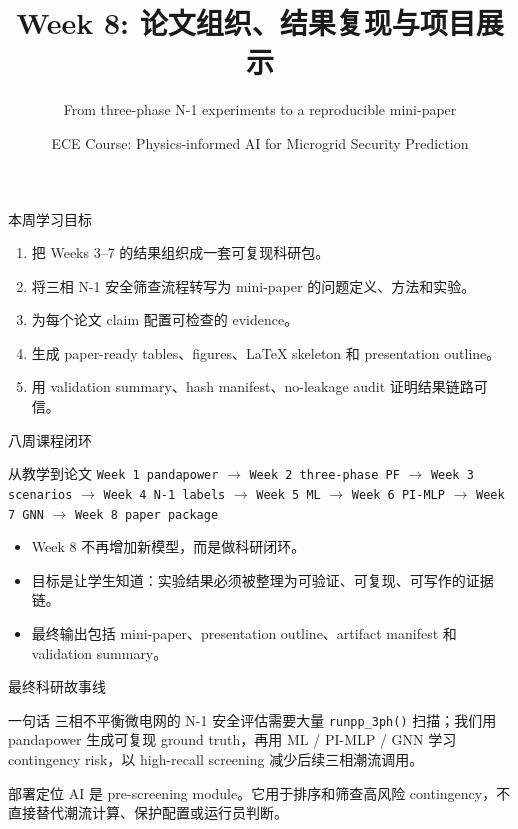 \documentclass[aspectratio=169,11pt]{beamer}
\title[Week 8]{Week 8: 论文组织、结果复现与项目展示}
\subtitle{From three-phase N-1 experiments to a reproducible mini-paper}
\author{ECE Course: Physics-informed AI for Microgrid Security Prediction}
\date{}
\begin{document}
\begin{frame}\titlepage\end{frame}

\begin{frame}{本周学习目标}
\begin{enumerate}
  \item 把 Weeks 3--7 的结果组织成一套可复现科研包。
  \item 将三相 N-1 安全筛查流程转写为 mini-paper 的问题定义、方法和实验。
  \item 为每个论文 claim 配置可检查的 evidence。
  \item 生成 paper-ready tables、figures、LaTeX skeleton 和 presentation outline。
  \item 用 validation summary、hash manifest、no-leakage audit 证明结果链路可信。
\end{enumerate}
\end{frame}

\begin{frame}{八周课程闭环}
\small
\begin{block}{从教学到论文}
\texttt{Week 1 pandapower} $\rightarrow$ \texttt{Week 2 three-phase PF} $\rightarrow$ \texttt{Week 3 scenarios} $\rightarrow$ \texttt{Week 4 N-1 labels} $\rightarrow$ \texttt{Week 5 ML} $\rightarrow$ \texttt{Week 6 PI-MLP} $\rightarrow$ \texttt{Week 7 GNN} $\rightarrow$ \texttt{Week 8 paper package}
\end{block}
\begin{itemize}
  \item Week 8 不再增加新模型，而是做科研闭环。
  \item 目标是让学生知道：实验结果必须被整理为可验证、可复现、可写作的证据链。
  \item 最终输出包括 mini-paper、presentation outline、artifact manifest 和 validation summary。
\end{itemize}
\end{frame}

\begin{frame}{最终科研故事线}
\begin{block}{一句话}
三相不平衡微电网的 N-1 安全评估需要大量 \texttt{runpp\_3ph()} 扫描；我们用 pandapower 生成可复现 ground truth，再用 ML / PI-MLP / GNN 学习 contingency risk，以 high-recall screening 减少后续三相潮流调用。
\end{block}
\begin{alertblock}{部署定位}
AI 是 pre-screening module。它用于排序和筛查高风险 contingency，不直接替代潮流计算、保护配置或运行员判断。
\end{alertblock}
\end{frame}
\end{document}
